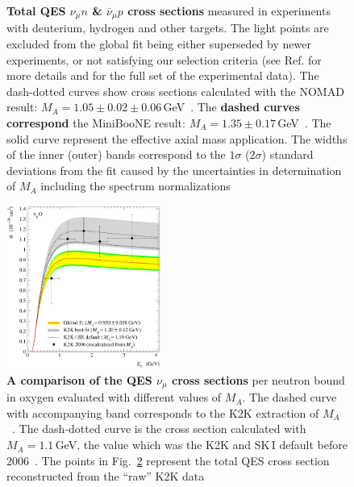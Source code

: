 \begin{figure}[htb!]
\caption{\label{TotalCS}\textbf{Total QES $\nu_{\mu}n$ \& $\bar\nu_{\mu}p$ cross sections} measured in experiments with deuterium, hydrogen and other targets. The light points are excluded from the global fit being either superseded by newer experiments, or not satisfying our selection criteria (see Ref.\cite{Kuzmin:2007kr} for more details and for the full set of the experimental data). The dash-dotted curves show cross sections calculated with the NOMAD result: $M_A=1.05\pm0.02\pm0.06$\,GeV~\cite{Lyubushkin:2008pe}. The \textbf{dashed curves correspond} the MiniBooNE result: $M_{A}=1.35\pm0.17$\,GeV~\cite{AguilarArevalo:2010zc}. The solid curve represent the effective axial mass application. The widths of the inner (outer) bands correspond to the $1\sigma$ ($2\sigma$) standard deviations from the fit caused by the uncertainties in determination of $M_A$ including the spectrum normalizations}
\end{figure}

\begin{figure}[htb!]
\begin{center}
\includegraphics[width=0.45\textwidth]{./QES/sQESCC_K2K06_101.3.00.301.00_2_BBBA25_SM.eps}
\caption{\label{K2K}\textbf{A comparison of the QES $\nu_{\mu}$ cross sections} per neutron bound in oxygen evaluated with different values of $M_A$. The dashed curve with accompanying band corresponds to the K2K extraction of $M_A$~\cite{Gran:2006jn}. The dash-dotted curve is the cross section calculated with $M_A=1.1$\,GeV, the value which was the K2K and SK\,I default before 2006~\cite{Gran:2006jn,Ashie:2005ik}. The points in Fig.~\ref{K2K} represent the total QES cross section reconstructed from the ``raw'' K2K data}
\end{center}
\end{figure}

